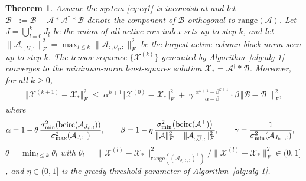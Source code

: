 \documentclass[11pt]{article}
\newtheorem{theorem}{Theorem}[section]
\def\fm#1{\mathcal{#1}}
\begin{document}
\begin{theorem}
Assume the system \eqref{eq:eq1} is inconsistent and let
$\fm B^\perp := \fm B - \fm A * \fm A^\dagger * \fm B$
denote the component of $\fm B$ orthogonal to $\mathrm{range}(\fm A)$.
Let $J = \bigcup_{l=0}^{k} J_l$ be the union of all active row-index sets up to step $k$,
and let $\|\fm A_{:,\overline{U},:}\|_F^2 = \max_{l \leq k}\|\fm A_{:,U_l,:}\|_F^2$
be the largest active column-block norm seen up to step $k$.
The tensor sequence $\{\fm X^{(k)}\}$ generated by Algorithm~\ref{alg:alg-1}
converges to the minimum-norm least-squares solution $\fm X_\ast = \fm A^\dagger * \fm B$.
Moreover, for all $k \geq 0$,
\begin{align}
    \Vert \fm X^{(k+1)} - \fm X_\ast \Vert_F^2
    \;\leq\;
    \alpha^{k+1}\Vert \fm X^{(0)} - \fm X_\ast \Vert_F^2
    \;+\;
    \gamma\,\frac{\alpha^{k+1}-\beta^{k+1}}{\alpha - \beta}
    \cdot\beta
    \,\Vert \fm B - \fm B^\perp \Vert_F^2,
\end{align}
where
\begin{align*}
\alpha &= 1 - \theta\,
    \frac{\sigma_{\min}^2\!\left(\bcirc(\fm A_{J,:,:})\right)}
         {\sigma_{\max}^2\!\left(\fm A_{J,:,:}\right)},
\qquad
\beta  = 1 - \eta\,
    \frac{\sigma_{\min}^2\!\left(\bcirc(\fm A^\top)\right)}
         {\|\fm A\|_F^2 - \|\fm A_{:,\overline{U},:}\|_F^2},
\qquad
\gamma = \frac{1}{\sigma_{\min}^2\!\left(\fm A_{J_k,:,:}\right)},
\end{align*}
$\theta = \min_{l \leq k}\theta_l$ with
$\theta_l = \|\fm X^{(l)} - \fm X_\ast\|^2_{\mathrm{range}((\fm A_{J_l,:,:})^\top)}\big/
            \|\fm X^{(l)} - \fm X_\ast\|_F^2 \in (0,1]$,
and $\eta \in (0,1]$ is the greedy threshold parameter of Algorithm~\ref{alg:alg-1}.
\end{theorem}
\end{document}
